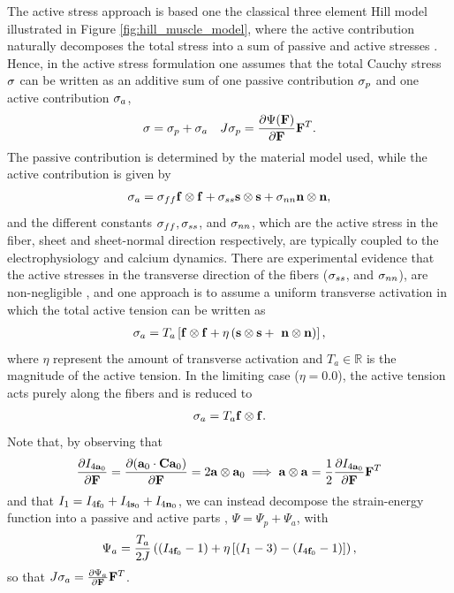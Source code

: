 The active stress approach is based one the classical three element
Hill model illustrated in Figure \ref{fig:hill_muscle_model}, where the
active contribution naturally decomposes the total stress into a sum
of passive and active stresses
\cite{nash2004electromechanical}. Hence, in the active stress
formulation \cite{hunter1998modelling} one assumes that the total
Cauchy stress $\mathbf{\sigma}$ can be written as an additive sum of one
passive contribution $\mathbf{\sigma}_p$ and one active contribution $\mathbf{\sigma}_a$,
\begin{align}
  \mathbf{\sigma} = \mathbf{\sigma}_p + \mathbf{\sigma}_a && J \mathbf{\sigma}_p =  \frac{\partial \Psi(\mathbf{F})}{\partial \mathbf{F}} \mathbf{F}^{T}.
\end{align}
The passive contribution is determined by the material model used,
while the active contribution is given by 
\begin{align}
  \mathbf{\sigma}_a = \mathbf{\sigma}_{ff} \mathbf{f} \otimes \mathbf{f} +
  \mathbf{\sigma}_{ss} \mathbf{s} \otimes \mathbf{s} +
  \mathbf{\sigma}_{nn} \mathbf{n} \otimes \mathbf{n},
\end{align}
and the different constants $\mathbf{\sigma}_{ff}, \mathbf{\sigma}_{ss}$, and
$\mathbf{\sigma}_{nn}$, which are the active stress in the fiber, sheet and
sheet-normal direction respectively, are typically coupled to the
electrophysiology and calcium dynamics.
There are experimental evidence that the active stresses in the
transverse direction of the fibers ($\mathbf{\sigma}_{ss}$, and $\mathbf{\sigma}_{nn}$),
are non-negligible \cite{lin1998multiaxial}, and one approach is to assume
a uniform transverse activation in which the total active tension
can be written as 
\begin{align}
  \mathbf{\sigma}_a = T_a \left[\mathbf{f} \otimes \mathbf{f} +
   \eta\left( \mathbf{s} \otimes \mathbf{s} +
  \ \mathbf{n} \otimes \mathbf{n} \right)\right],
  \label{eq:intro_active_stress}
\end{align}
where $\eta$ represent the amount of transverse activation and $T_a
\in \mathbb{R}$ is the magnitude of the active tension.
In the limiting case ($\eta = 0.0$), the active tension acts purely
along the fibers and is reduced to 
\begin{align}
  \mathbf{\sigma}_a = T_a \mathbf{f} \otimes \mathbf{f}.
\end{align}
Note that, by observing  that
\begin{align*}
  \frac{\partial I_{4\mathbf{a}_0}}{\partial \mathbf{F}} = \frac{\partial (\mathbf{a}_0  \cdot \mathbf{C} \mathbf{a}_0 )}{\partial \mathbf{F}}
  = 2 \mathbf{a} \otimes \mathbf{a}_0 \implies  \mathbf{a} \otimes  \mathbf{a}= \frac{1}{2} \frac{\partial I_{4\mathbf{a}_0}}{\partial \mathbf{F}} \mathbf{F}^{T}
\end{align*}
and that $I_1 =  I_{4\mathbf{f}_0} +  I_{4\mathbf{s}_0} +  I_{4\mathbf{n}_0}$, 
we can instead decompose the strain-energy function into a passive and active
parts \cite{pathmanathan2010cardiac}, $\Psi= \Psi_p + \Psi_a$, with
\begin{align}
\Psi_a = \frac{T_a}{2J} \left(( I_{4\mathbf{f}_0} - 1)  + \eta \left[ (I_1 - 3) -
    (I_{4\mathbf{f}_0} - 1)\right] \right), 
\end{align}
so that $J \mathbf{\sigma}_a  = \frac{\partial \Psi_a}{\partial \mathbf{F}}
\mathbf{F}^{T}$.

